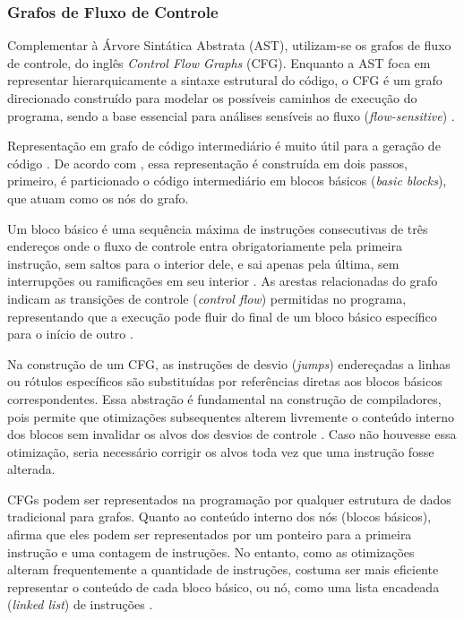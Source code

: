 \documentclass[
    12pt,                %
    openright,           %
    oneside,             %
    a4paper,             %
    english,             %
    brazil               %
]{abntex2}
\begin{document}
\subsubsection{Grafos de Fluxo de Controle}
\label{sec:gfc}
\par
Complementar à Árvore Sintática Abstrata (AST), utilizam-se os grafos de fluxo de controle, do inglês \textit{Control Flow Graphs} (CFG).
Enquanto a AST foca em representar hierarquicamente a sintaxe estrutural do código, o CFG é um grafo direcionado construído para modelar os possíveis caminhos de execução do programa, sendo a base essencial para análises sensíveis ao fluxo (\textit{flow-sensitive}) \cite{aho2007compilers}.
\par
Representação em grafo de código intermediário é muito útil para a geração de código \cite{aho2007compilers}.
De acordo com , essa representação é construída em dois passos, primeiro, é particionado o código intermediário em blocos básicos (\textit{basic blocks}), que atuam como os nós do grafo.
\par
Um bloco básico é uma sequência máxima de instruções consecutivas de três endereços onde o fluxo de controle entra obrigatoriamente pela primeira instrução, sem saltos para o interior dele, e sai apenas pela última, sem interrupções ou ramificações em seu interior \cite{aho2007compilers}.
As arestas relacionadas do grafo indicam as transições de controle (\textit{control flow}) permitidas no programa, representando que a execução pode fluir do final de um bloco básico específico para o início de outro \cite{aho2007compilers}.
\par
Na construção de um CFG, as instruções de desvio (\textit{jumps}) endereçadas a linhas ou rótulos específicos são substituídas por referências diretas aos blocos básicos correspondentes.
Essa abstração é fundamental na construção de compiladores, pois permite que otimizações subsequentes alterem livremente o conteúdo interno dos blocos sem invalidar os alvos dos desvios de controle \cite{aho2007compilers}.
Caso não houvesse essa otimização, seria necessário corrigir os alvos toda vez que uma instrução fosse alterada.
\par
CFGs podem ser representados na programação por qualquer estrutura de dados tradicional para grafos. 
Quanto ao conteúdo interno dos nós (blocos básicos),  afirma que eles podem ser representados por um ponteiro para a primeira instrução e uma contagem de instruções.
No entanto, como as otimizações alteram frequentemente a quantidade de instruções, costuma ser mais eficiente representar o conteúdo de cada bloco básico, ou nó, como uma lista encadeada (\textit{linked list}) de instruções \cite{aho2007compilers}.
\end{document}
